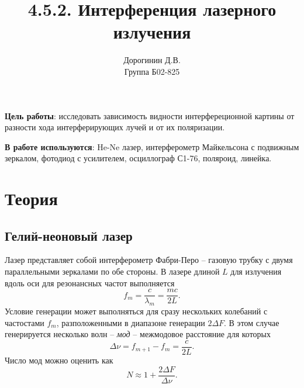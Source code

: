 \documentclass[a4paper,12pt]{article}
\author{Дорогинин Д.В.\\
Группа Б02-825}
\title{4.5.2. Интерференция лазерного излучения}
\date{}
\begin{document}
\maketitle
\textbf{Цель работы}: исследовать зависимость видности интерфереционной картины от разности хода интерферирующих лучей и от их поляризации.


\textbf{В работе используются}: He-Ne лазер, интерферометр Майкельсона с подвижным зеркалом, фотодиод с усилителем, осциллограф С1-76, поляроид, линейка.
\section*{Теория}
\subsection*{Гелий-неоновый лазер}
Лазер представляет собой интерферометр Фабри-Перо -- газовую трубку с двумя параллельными зеркалами по обе стороны. В лазере длиной $L$ для излучения вдоль оси для резонансных частот выполняется
\begin{equation}
f_m = \dfrac{c}{\lambda_m} = \dfrac{mc}{2L}.
\end{equation}
Условие генерации может выполняться для сразу нескольких колебаний с частостами $f_m$, разположенными в диапазоне генерации $2\Delta F$. В этом случае генерируется несколько волн -- \textit{мод} -- межмодовое расстояние для которых
\begin{equation}
\Delta \nu = f_{m+1} - f_m = \dfrac{c}{2L}.
\end{equation}
Число мод можно оценить как 
\begin{equation}
N \approx 1 + \dfrac{2\Delta F}{\Delta \nu}.
\end{equation}
\end{document}
